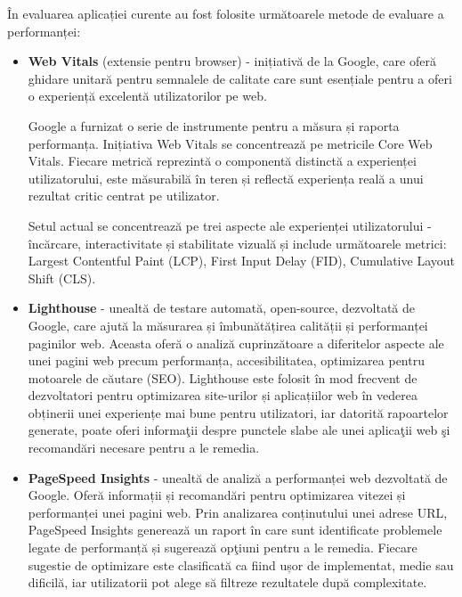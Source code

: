 \documentclass[12pt, a4paper]{report}
\begin{document}
În evaluarea aplicației curente au fost folosite următoarele metode de evaluare a performanței:

\begin{itemize}
	\item  \textbf{Web Vitals} (extensie pentru browser) - inițiativă de la Google, care oferă ghidare unitară pentru semnalele de calitate care sunt esențiale pentru a oferi o experiență excelentă utilizatorilor pe web.

	      Google a furnizat o serie de instrumente pentru a măsura și raporta performanța. Inițiativa Web Vitals se concentreaz\u a pe metricile Core Web Vitals. Fiecare metric\u a reprezintă o componentă distinctă a experienței utilizatorului, este măsurabilă în teren și reflectă experiența reală a unui rezultat critic centrat pe utilizator. \cite{web-vitals}

	      Setul actual se concentrează pe trei aspecte ale experienței utilizatorului - încărcare, interactivitate și stabilitate vizuală și include următoarele metrici: Largest Contentful Paint (LCP), First Input Delay (FID), Cumulative Layout Shift (CLS).

	\item \textbf{Lighthouse} - unealtă de testare automată, open-source, dezvoltată de Google, care ajută la măsurarea și îmbunătățirea calității și performanței paginilor web. Aceasta oferă o analiză cuprinzătoare a diferitelor aspecte ale unei pagini web precum performanța, accesibilitatea, optimizarea pentru motoarele de căutare (SEO). Lighthouse este folosit în mod frecvent de dezvoltatori pentru optimizarea site-urilor și aplicațiilor web în vederea obținerii unei experiențe mai bune pentru utilizatori, iar datorită rapoartelor generate, poate oferi informa\c tii despre punctele slabe ale unei aplica\c tii web \c si recomand\u ari necesare pentru a le remedia.

	\item \textbf{PageSpeed Insights} - unealtă de analiză a performanței web dezvoltată de Google. Oferă informații și recomandări pentru optimizarea vitezei și performanței unei pagini web. Prin analizarea conținutului unei adrese URL, PageSpeed Insights generează un raport \^in care sunt identificate problemele legate de performanță și sugerează op\c tiuni pentru a le remedia. Fiecare sugestie de optimizare este clasificată ca fiind ușor de implementat, medie sau dificilă, iar utilizatorii pot alege să filtreze rezultatele după complexitate.
\end{itemize}
\end{document}
